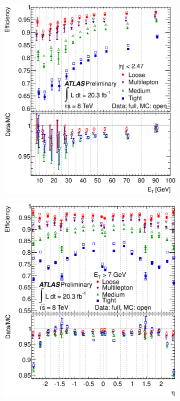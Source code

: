 \begin{figure}[h]
\begin{subfigure}{0.5\textwidth}
   \includegraphics[width=\textwidth]{figures/can_CompEffDataMCLooseMultileptonMediumTightall_0.eps}
	\caption{\eT}
\end{subfigure} %
\begin{subfigure}{0.5\textwidth}
   \includegraphics[width=\textwidth]{figures/can_CompEffEtaDataMCLooseMultileptonMediumTightone_0.eps}

\end{subfigure}
\end{figure}
